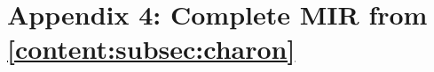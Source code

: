\section{Appendix 4: Complete MIR from \ref{content:subsec:charon}}

\inputminted[fontsize=\footnotesize,breaklines]{bash}{3_Chapter3/CHARON_example/mir_full.txt}